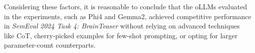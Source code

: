 Considering these factors, it is reasonable to conclude that the \acp{oLLM} evaluated in the experiments, such as Phi4 and Gemma2, achieved competitive performance in \textit{SemEval 2024 Task 4: BrainTeaser} without relying on advanced techniques like \ac{CoT}, cherry-picked examples for few-shot prompting, or opting for larger parameter-count counterparts.

